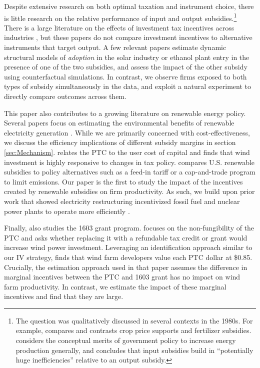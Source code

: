 \documentclass[12pt]{article}
\begin{document}
Despite extensive research on both optimal taxation and instrument choice, there is little research on the relative performance of input and output subsidies.\footnote{The question was qualitatively discussed in several contexts in the 1980s. For example, \cite{stiglizWB1987} compares and contrasts crop price supports and fertilizer subsidies. \citet{schmalensee_appropriate_1980} considers the conceptual merits of government policy to increase energy production generally, and concludes that input subsidies build in ``potentially huge inefficiencies'' relative to an output subsidy.} There is a large literature on the effects of investment tax incentives across industries \citep[e.g.,][]{goolsbee_investment_1998,goolsbee_taxes_2004,house_temporary_2008}, but these papers do not compare investment incentives to alternative instruments that target output. A few relevant papers estimate dynamic structural models of \textit{adoption} in the solar industry \citep{burr2016subsidies,de_groote_subsidies_2019} or ethanol plant entry \citep{yi2018dynamic} in the presence of one of the two subsidies, and assess the impact of the other subsidy using counterfactual simulations. In contrast, we observe firms exposed to both types of subsidy simultaneously in the data, and exploit a natural experiment to directly compare outcomes across them. 

This paper also contributes to a growing literature on renewable energy policy. Several papers focus on estimating the environmental benefits of renewable electricity generation \citep[e.g.,][]{cullen_measuring_2013,novan_valuing_2015,callaway_location_2018,fell_emissions_nodate}. While we are primarily concerned with cost-effectiveness, we discuss the efficiency implications of different subsidy margins in section \ref{sec:Mechanism}. \citet{metcalf_investment_2010} relates the PTC to the user cost of capital and finds that wind investment is highly responsive to changes in tax policy. \citet{schmalensee_evaluating_2012} compares U.S. renewable subsidies to policy alternatives such as a feed-in tariff or a cap-and-trade program to limit emissions. Our paper is the first to study the impact of the incentives created by renewable subsidies on firm productivity. As such, we build upon prior work that showed electricity restructuring incentivized fossil fuel and nuclear power plants to operate more efficiently \citep[e.g.,][]{fabrizio_markets_2007,davis_deregulation_2012,cicala_when_2015}.

Finally, \cite{johnston_nonrefundable_2019} also studies the 1603 grant program. \citeauthor{johnston_nonrefundable_2019} focuses on the non-fungibility of the PTC and asks whether replacing it with a refundable tax credit or grant would increase wind power investment. Leveraging an identification approach similar to our IV strategy, \citeauthor{johnston_nonrefundable_2019} finds that wind farm developers value each PTC dollar at \$0.85. Crucially, the estimation approach used in that paper assumes the difference in marginal incentives between the PTC and 1603 grant has no impact on wind farm productivity. In contrast, we estimate the impact of these marginal incentives and find that they are large.
\end{document}
